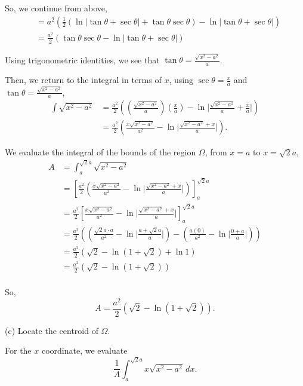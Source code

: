 \documentclass[../hw8]{subfiles}
\begin{document}
So, we continue from above,
\begin{align*}
    &= a^2\left( \frac{1}{2}\left( \ln{|\tan{\theta}+\sec{\theta}|} + \tan{\theta}\sec{\theta} \right) - \ln{|\tan{\theta}+\sec{\theta}|} \right) \\
    &= \frac{a^2}{2}\left( \tan{\theta}\sec{\theta} - \ln{|\tan{\theta} + \sec{\theta}|} \right)
\end{align*}

Using trigonometric identities, we see that $\tan{\theta}=\frac{\sqrt{x^2-a^2}}{a}$.

Then, we return to the integral in terms of $x$, using $\sec{\theta}=\frac{x}{a}$ and $\tan{\theta}=\frac{\sqrt{x^2-a^2}}{a}$,
\begin{align*}
    \int \sqrt{x^2-a^2} &= \frac{a^2}{2}\left( \left( \frac{\sqrt{x^2-a^2}}{a} \right) \left( \frac{x}{a} \right) - \ln{\Bigg|\frac{\sqrt{x^2-a^2}}{a}+\frac{x}{a}\Bigg|} \right) \\
    &=\frac{a^2}{2}\left( \frac{x\sqrt{x^2-a^2}}{a^2} -\ln{\Bigg|\frac{\sqrt{x^2-a^2}+x}{a}\Bigg|} \right).
\end{align*}

We evaluate the integral of the bounds of the region $\Omega$, from $x=a$ to $x=\sqrt{2}a$,
\begin{align*}
    A &= \int_{a}^{\sqrt{2}a} \sqrt{x^2-a^2} \\
    &= {\left[ \frac{a^2}{2}\left( \frac{x\sqrt{x^2-a^2}}{a^2} -\ln{\Bigg|\frac{\sqrt{x^2-a^2}+x}{a}\Bigg|} \right) \right]}_{a}^{\sqrt{2}a} \\
    &= \frac{a^2}{2}{\left[ \frac{x\sqrt{x^2-a^2}}{a^2} -\ln{\Bigg|\frac{\sqrt{x^2-a^2}+x}{a}\Bigg|}\right]}_{a}^{\sqrt{2}a} \\
    &= \frac{a^2}{2} \left( \left( \frac{\sqrt{2}a\cdot a}{a^2} -\ln{\Bigg|\frac{a+\sqrt{2}a}{a}\Bigg|}\right) - \left( \frac{a(0)}{a^2}-\ln{\Bigg|\frac{0+a}{a}\Bigg|}\right) \right) \\
    &= \frac{a^2}{2} \left( \sqrt{2} - \ln{(1+\sqrt{2})} +\ln{1} \right) \\
    &= \frac{a^2}{2} \left( \sqrt{2} - \ln{(1+\sqrt{2})} \right) \\
\end{align*}

So, \[A=\frac{a^2}{2} \left( \sqrt{2} - \ln{(1+\sqrt{2})} \right).\]

(c) Locate the centroid of $\Omega$.

For the $x$ coordinate, we evaluate
\[\frac{1}{A}\int_{a}^{\sqrt{2}a}x\sqrt{x^2-a^2}\,dx.\]
\end{document}
